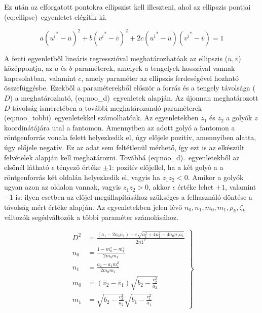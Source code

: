 \documentclass[a4paper,12pt]{article}
\begin{document}
Ez után az elforgatott pontokra ellipszist kell illeszteni, ahol az ellipszis pontjai \aref({eq:ellipse})~egyenletet elégítik ki. 

\begin{equation}
\label{eq:ellipse}
a \left ( {u^i}^* - \overline{u} \right )^2 + b  \left ( {v^i}^* - \overline{v} \right )^2 + 2c  \left ( {u^i}^* - \overline{u} \right ) \left ({v^i}^* - \overline{v} \right ) = 1
\end{equation}


A fenti egyenletből lineáris regresszióval meghatározhatóak az ellipszis ($\overline{u}, \overline{v}$) középpontja, az $a$ és $b$ paraméterek, amelyek a tengelyek hosszával vannak kapcsolatban, valamint $c$, amely paraméter az ellipszis ferdeségével hozható összefüggésbe.  Ezekből a paraméterekből először a forrás és a tengely távolsága ($D$) a meghatározható, \aref({eq:noo_d})~egyenletek alapján. Az újonnan meghatározott $D$ távolság ismeretében a további meghatározandó paraméterek \aref({eq:noo_tobbi})~egyenletekkel számolhatóak. Az egyenletekben $z_1$ és $z_2$ a golyók $z$ koordinátájára utal a fantomon. Amennyiben az adott golyó a fantomon a röntgenforrás vonala felett helyezkedik el, úgy előjele pozitív, amennyiben alatta, úgy előjele negatív. Ez az adat sem feltétlenül mérhető, így ezt is az elkészült felvételek alapján kell meghatározni. Továbbá \aref({eq:noo_d}).~egyenletekből az elsőnél látható $\epsilon$ tényező értéke $\pm1$: pozitív előjellel, ha a két golyó a a röntgenforrás két oldalán helyezkedik el, vagyis ha $z_1z_2 < 0$. Amikor a golyók ugyan azon az oldalon vannak, vagyis $z_1z_2>0$, akkor $\epsilon$ értéke lehet $+1$, valamint $-1$ is: ilyen esetben az előjel megállapításához szükséges a felhasználó döntése a távolság mért értéke alapján. Az egyenletekben jelen lévő $n_0, n_1, m_0, m_1, \rho_k, \zeta_k$ változók segédváltozók a többi paraméter számolásához.

\begin{equation}
\label{eq:noo_d}
\left.
\begin{split}
D^2 &= \frac{(a_1- 2n_0n_1 )- \epsilon \sqrt{a_1^2+ 4n_1^2 - 4n_0n_1a_1}}{2n1^2}\\
n_0&= \frac {1-m_0^2-m_1^2}{2m_0m_1}\\
n_1&= \frac{a_2-a_1m_1^2}{2m_0m_1}\\ 
m_0 &=\left ( \overline{v}_2 - \overline{v}_1 \right) \sqrt{b_2-\frac{c_2^2}{a_2}}\\
m_1 &= \sqrt{b_2 - \frac{c_2^2}{a_2}} \sqrt{b_1- \frac{c_1^2}{a_1}} 
\end{split}
\right\}
\end{equation}
\end{document}
